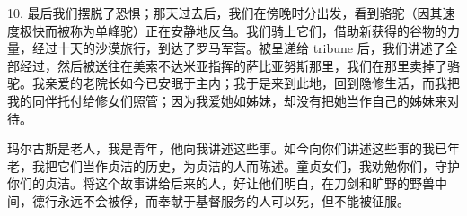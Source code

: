 10. 最后我们摆脱了恐惧；那天过去后，我们在傍晚时分出发，看到骆驼（因其速度极快而被称为单峰驼）正在安静地反刍。我们骑上它们，借助新获得的谷物的力量，经过十天的沙漠旅行，到达了罗马军营。被呈递给 tribune 后，我们讲述了全部经过，然后被送往在美索不达米亚指挥的萨比亚努斯那里，我们在那里卖掉了骆驼。我亲爱的老院长如今已安眠于主内；我于是来到此地，回到隐修生活，而我把我的同伴托付给修女们照管；因为我爱她如姊妹，却没有把她当作自己的姊妹来对待。\par

玛尔古斯是老人，我是青年，他向我讲述这些事。如今向你们讲述这些事的我已年老，我把它们当作贞洁的历史，为贞洁的人而陈述。童贞女们，我劝勉你们，守护你们的贞洁。将这个故事讲给后来的人，好让他们明白，在刀剑和旷野的野兽中间，德行永远不会被俘，而奉献于基督服务的人可以死，但不能被征服。\par

